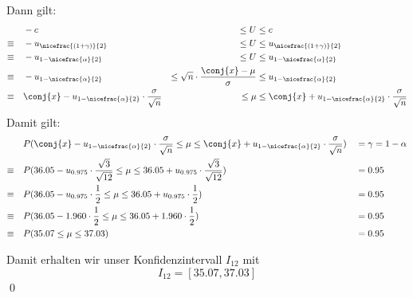 \documentclass{abgabe}
\begin{document}
\begin{questions}
\begin{solution}
        Dann gilt: 
        \begin{alignat*}{3}
                         & -c                                                                    & \leq U                                            & \leq c                                                                     \\ 
            \equiv \quad & -u_{\nicefrac{(1 + \gamma)}{2}}                                       & \leq U                                            & \leq u_{\nicefrac{(1 + \gamma)}{2}}                                        \\ 
            \equiv \quad & -u_{1 - \nicefrac{\alpha}{2}}                                         & \leq U                                            & \leq u_{1 - \nicefrac{\alpha}{2}}                                          \\ 
            \equiv \quad & -u_{1 - \nicefrac{\alpha}{2}}                                         & \leq \sqrt{n} \cdot \frac{\conj{x} - \mu}{\sigma} & \leq u_{1 - \nicefrac{\alpha}{2}}                                          \\ 
            \equiv \quad & \conj{x} - u_{1 - \nicefrac{\alpha}{2}} \cdot \frac{\sigma}{\sqrt{n}} & \leq \mu                                          & \leq \conj{x} + u_{1 - \nicefrac{\alpha}{2}} \cdot \frac{\sigma}{\sqrt{n}}
        \end{alignat*}
        Damit gilt: 
        \begin{alignat*}{2}
                         & P(\conj{x} - u_{1 - \nicefrac{\alpha}{2}} \cdot \frac{\sigma}{\sqrt{n}} \leq \mu \leq \conj{x} + u_{1 - \nicefrac{\alpha}{2}} \cdot \frac{\sigma}{\sqrt{n}}) &  & = \gamma = 1 - \alpha \\ 
            \equiv \quad & P(36.05 - u_{0.975} \cdot \frac{\sqrt{3}}{\sqrt{12}} \leq \mu \leq 36.05 + u_{0.975} \cdot \frac{\sqrt{3}}{\sqrt{12}})                                       &  & = 0.95                \\ 
            \equiv \quad & P(36.05 - u_{0.975} \cdot \frac{1}{2} \leq \mu \leq 36.05 + u_{0.975} \cdot \frac{1}{2})                                                                     &  & = 0.95                \\ 
            \equiv \quad & P(36.05 - 1.960 \cdot \frac{1}{2} \leq \mu \leq 36.05 + 1.960 \cdot \frac{1}{2})                                                                             &  & = 0.95                \\ 
            \equiv \quad & P(35.07 \leq \mu \leq 37.03)                                                                                                                                 &  & = 0.95  
        \end{alignat*}
        
        Damit erhalten wir unser Konfidenzintervall $I_{12}$ mit 
        \[ 
            I_{12} = [35.07, 37.03]
        \]
        \qed
    \end{solution}
    
\end{questions}
\end{document}
